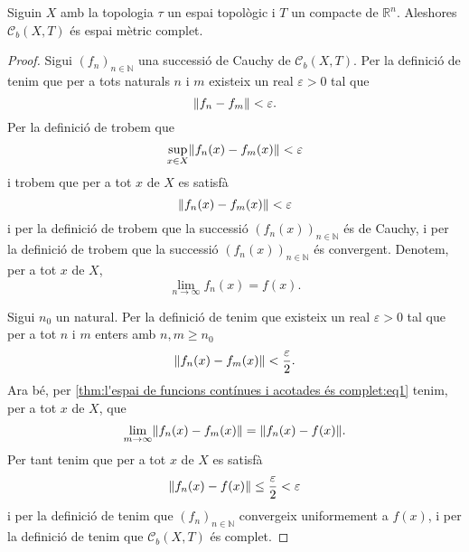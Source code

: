\documentclass[../../Main.tex]{subfiles}
\begin{document}
	\begin{theorem}
		\label{thm:l'espai de funcions contínues i acotades és complet}
		Siguin \(X\) amb la topologia \(\tau\) un espai topològic i \(T\) un compacte de \(\mathbb{R}^{n}\).
		Aleshores \(\mathcal{C}_{b}(X,T)\) és espai mètric complet.
		\begin{proof}
			Sigui \((f_{n})_{n\in\mathbb{N}}\) una successió de Cauchy de \(\mathcal{C}_{b}(X,T)\).
			Per la definició de  tenim que per a tots naturals \(n\) i \(m\) existeix un real \(\varepsilon>0\) tal que
			\[
			    \norm{f_{n}-f_{m}}<\varepsilon.
			\]
			Per la definició de  trobem que
			\[
			    \sup_{x\in X}\norm{f_{n}(x)-f_{m}(x)}<\varepsilon
			\]
			i trobem que per a tot \(x\) de \(X\) es satisfà
			\[
			    \norm{f_{n}(x)-f_{m}(x)}<\varepsilon
			\]
			i per la definició de  trobem que la successió \((f_{n}(x))_{n\in\mathbb{N}}\) és de Cauchy, i per la definició de  trobem que la successió \((f_{n}(x))_{n\in\mathbb{N}}\) és convergent.
			Denotem, per a tot \(x\) de \(X\),
			\begin{equation}
				\label{thm:l'espai de funcions contínues i acotades és complet:eq1}
				\lim_{n\to\infty}f_{n}(x)=f(x).
			\end{equation}
			
			Sigui \(n_{0}\) un natural.
			Per la definició de  tenim que existeix un real \(\varepsilon>0\) tal que per a tot \(n\) i \(m\) enters amb \(n,m\geq n_{0}\)
			\[
			    \norm{f_{n}(x)-f_{m}(x)}<\frac{\varepsilon}{2}.
			\]
			Ara bé, per \eqref{thm:l'espai de funcions contínues i acotades és complet:eq1} tenim, per a tot \(x\) de \(X\), que
			\[
			    \lim_{m\to\infty}\norm{f_{n}(x)-f_{m}(x)}=\norm{f_{n}(x)-f(x)}.
			\]
			Per tant tenim que per a tot \(x\) de \(X\) es satisfà
			\[
			    \norm{f_{n}(x)-f(x)}\leq\frac{\varepsilon}{2}<\varepsilon
			\]
			i per la definició de  tenim que \((f_{n})_{n\in\mathbb{N}}\) convergeix uniformement a \(f(x)\), i per la definició de  tenim que \(\mathcal{C}_{b}(X,T)\) és complet.
		\end{proof}
	\end{theorem}
\end{document}
